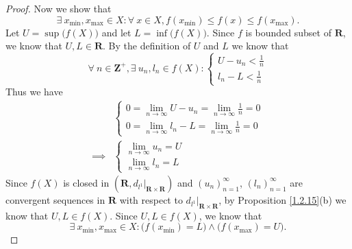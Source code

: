 \begin{proof}
    Now we show that
    \[
        \exists\ x_{\min}, x_{\max} \in X : \forall\ x \in X, f(x_{\min}) \leq f(x) \leq f(x_{\max}).
    \]
    Let \(U = \sup\big(f(X)\big)\) and let \(L = \inf\big(f(X)\big)\).
    Since \(f\) is bounded subset of \(\mathbf{R}\), we know that \(U, L \in \mathbf{R}\).
    By the definition of \(U\) and \(L\) we know that
    \[
        \forall\ n \in \mathbf{Z}^+, \exists\ u_n, l_n \in f(X) : \begin{cases}
            U - u_n < \frac{1}{n} \\
            l_n - L < \frac{1}{n}
        \end{cases}
    \]
    Thus we have
    \begin{align*}
                 & \begin{cases}
            0 = \lim_{n \to \infty} U - u_n = \lim_{n \to \infty} \frac{1}{n} = 0 \\
            0 = \lim_{n \to \infty} l_n - L = \lim_{n \to \infty} \frac{1}{n} = 0
        \end{cases} \\
        \implies & \begin{cases}
            \lim_{n \to \infty} u_n = U \\
            \lim_{n \to \infty} l_n = L
        \end{cases}
    \end{align*}
    Since \(f(X)\) is closed in \((\mathbf{R}, d_{l^1}|_{\mathbf{R} \times \mathbf{R}})\) and \((u_n)_{n = 1}^\infty\), \((l_n)_{n = 1}^\infty\) are convergent sequences in \(\mathbf{R}\) with respect to \(d_{l^1}|_{\mathbf{R} \times \mathbf{R}}\), by Proposition \ref{1.2.15}(b) we know that \(U, L \in f(X)\).
    Since \(U, L \in f(X)\), we know that
    \[
        \exists\ x_{\min}, x_{\max} \in X : \big(f(x_{\min}) = L\big) \land \big(f(x_{\max}) = U\big).
    \]
\end{proof}
